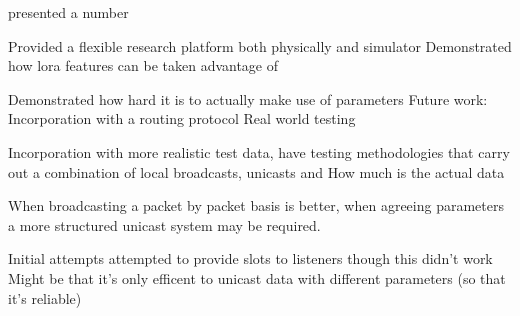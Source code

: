  presented a number 

Provided a flexible research platform both physically and simulator
Demonstrated how lora features can be taken advantage of

Demonstrated how hard it is to actually make use of parameters
Future work:
Incorporation with a routing protocol
Real world testing

Incorporation with more realistic test data, have testing methodologies that carry out a combination of local broadcasts, unicasts and 
How much is the actual data



When broadcasting a packet by packet basis is better, when agreeing parameters a more structured unicast system may be required.


Initial attempts attempted to provide slots to listeners though this didn't work
Might be that it's only efficent to unicast data with different parameters (so that it's reliable)



%

%

%
%






